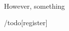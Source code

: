 However, something 

\begin{listing}[htbp]
  \caption{\label{lst:}}
  \begin{rcode}

  \end{rcode}
\end{listing}

/todo[register]





